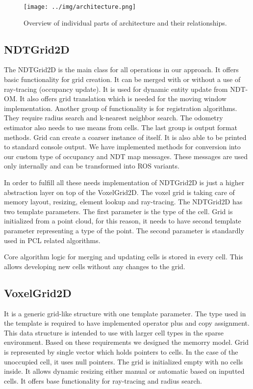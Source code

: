  \begin{figure}
 	\centering
 	\texttt{[image: ../img/architecture.png]}
 	\caption{Overview of individual parts of architecture and their relationships.}\label{fig:architecture}
 \end{figure}
      
\subsection{NDTGrid2D}
The NDTGrid2D is the main class for all operations in our approach. It offers basic functionality for grid creation. It can be merged with or without a use of ray-tracing (occupancy update). It is used for dynamic entity update from \gls{NDT-OM}. It also offers grid translation which is needed for the moving window implementation. Another group of functionality is for registration algorithms. They require radius search and k-nearest neighbor search. The odometry estimator also needs to use means from cells. The last group is output format methods. Grid can create a coarser instance of itself. It is also able to be printed to standard console output. We have implemented methods for conversion into our custom type of occupancy and \gls{NDT} map messages. These messages are used only internally and can be transformed into \gls{ROS} variants.

In order to fulfill all these needs implementation of NDTGrid2D is just a higher abstraction layer on top of the VoxelGrid2D. The voxel grid is taking care of memory layout, resizing, element lookup and ray-tracing. The NDTGrid2D has two template parameters. The first parameter is the type of the cell. Grid is initialized from a point cloud, for this reason, it needs to have second template parameter representing a type of the point. The second parameter is standardly used in \gls{PCL} related algorithms.  

Core algorithm logic for merging and updating cells is stored in every cell. This allows developing new cells without any changes to the grid.
\subsection{VoxelGrid2D}
It is a generic grid-like structure with one template parameter. The type used in the template is required to have implemented operator plus and copy assignment. This data structure is intended to use with larger cell types in the sparse environment. Based on these requirements we designed the memorry model. Grid is represented by single vector which holds pointers to cells. In the case of the unoccupied cell, it uses null pointers. The grid is initialized empty with no cells inside. It allows dynamic resizing either manual or automatic based on inputted cells.  It offers base functionality for ray-tracing and radius search. 
